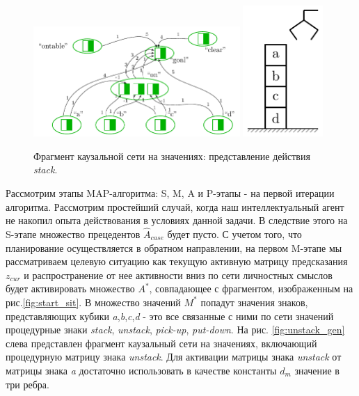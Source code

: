 \documentclass[12pt]{report}
\begin{document}
	\begin{figure}
		\centering
		\includegraphics[width=0.7\textwidth,page=2]{examples/plan/plan_nets}
		\includegraphics[width=0.27\textwidth,page=3]{examples/plan/block_world}
		\caption{Фрагмент каузальной сети на значениях: представление действия \textit{stack}.}	
		\label{fig:stack_sig}	
	\end{figure}
	
	Рассмотрим этапы MAP-алгоритма: S, M, A и P-этапы - на первой итерации алгоритма. Рассмотрим простейший случай, когда наш интеллектуальный агент не накопил опыта действования в условиях данной задачи. В следствие этого на S-этапе множество прецедентов $\hat A_{case}$ будет пусто. С учетом того, что планирование осуществляется в обратном направлении, на первом M-этапе мы рассматриваем целевую ситуацию как текущую активную матрицу предсказания $z_{cur}$ и распространение от нее активности вниз по сети личностных смыслов будет активировать множество $A^*$, совпадающее с фрагментом, изображенным на рис.\ref{fig:start_sit}. В множество значений $M^*$ попадут значения знаков, представляющих кубики \textit{a},\textit{b},\textit{c},\textit{d} - это все связанные с ними по сети значений процедурные знаки \textit{stack}, \textit{unstack}, \textit{pick-up}, \textit{put-down}. На рис. \ref{fig:unstack_gen} слева представлен фрагмент каузальный сети на значениях, включающий процедурную матрицу знака \textit{unstack}. Для активации матрицы знака \textit{unstack} от матрицы знака \textit{a} достаточно использовать в качестве константы $d_m$ значение в три ребра.
	
\end{document}
